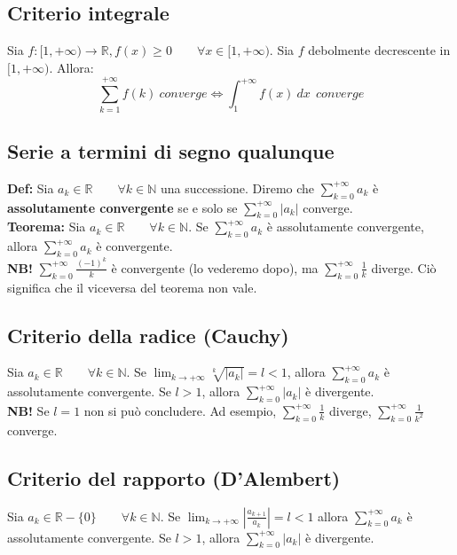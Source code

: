 \documentclass{article}
\begin{document}
\subsection{Criterio integrale}
Sia $f: [1, +\infty) \xrightarrow{} \mathbb{R}, f(x) \geq 0 \qquad \forall x \in [1, +\infty)$. Sia $f$ debolmente decrescente in $[1, +\infty)$. Allora:
\begin{equation*}
    \sum_{k = 1}^{+\infty} f(k) \ converge \iff \int_1^{+\infty} f(x) \ dx \ \ converge
\end{equation*}

\subsection{Serie a termini di segno qualunque}
\textbf{Def:} Sia $a_k \in \mathbb{R} \qquad \forall k \in \mathbb{N}$ una successione. Diremo che $\sum_{k = 0}^{+\infty} a_k$ è \textbf{assolutamente convergente} se e solo se $\sum_{k = 0}^{+\infty} |a_k|$ converge.\\

\noindent\textbf{Teorema:} Sia $a_k \in \mathbb{R} \qquad \forall k \in \mathbb{N}$. Se $\sum_{k = 0}^{+\infty} a_k$ è assolutamente convergente, allora $\sum_{k = 0}^{+\infty} a_k$ è convergente.\\

\noindent\textbf{NB!} $\sum_{k = 0}^{+\infty} \frac{(-1)^k}{k}$ è convergente (lo vederemo dopo), ma $\sum_{k = 0}^{+\infty} \frac{1}{k}$ diverge. Ciò significa che il viceversa del teorema non vale.

\subsection{Criterio della radice (Cauchy)}
Sia $a_k \in \mathbb{R} \qquad \forall k \in \mathbb{N}$. Se $\lim_{k \to +\infty} \sqrt[k]{|a_k|} = l < 1$, allora $\sum_{k = 0}^{+\infty} a_k$ è assolutamente convergente. Se $l > 1$, allora $\sum_{k = 0}^{+\infty} |a_k|$ è divergente.\\

\noindent\textbf{NB!} Se $l = 1$ non si può concludere. Ad esempio, $\sum_{k = 0}^{+\infty} \frac{1}{k}$ diverge, $\sum_{k = 0}^{+\infty} \frac{1}{k^2}$ converge.

\subsection{Criterio del rapporto (D'Alembert)}
Sia $a_k \in \mathbb{R} - \{0\} \qquad \forall k \in \mathbb{N}$. Se $\lim_{k \to +\infty} |\frac{a_{k + 1}}{a_k}| = l < 1$ allora $\sum_{k = 0}^{+\infty} a_k$ è assolutamente convergente. Se $l > 1$, allora $\sum_{k = 0}^{+\infty} |a_k|$ è divergente.\\
\end{document}
